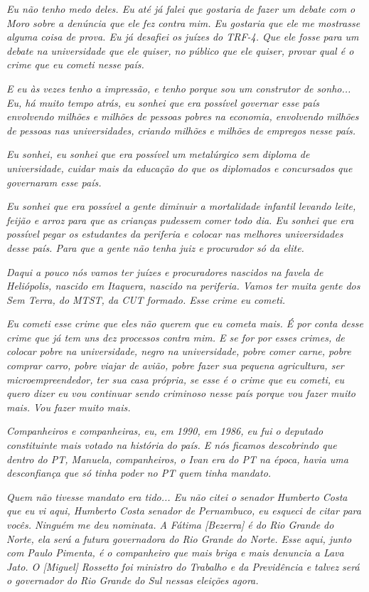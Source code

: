 \emph{Eu não tenho medo deles. Eu até já falei que gostaria de fazer um
debate com o Moro sobre a denúncia que ele fez contra mim. Eu gostaria
que ele me mostrasse alguma coisa de prova. Eu já desafiei os juízes do
TRF-4. Que ele fosse para um debate na universidade que ele quiser, no
público que ele quiser, provar qual é o crime que eu cometi nesse país.}

\emph{E eu às vezes tenho a impressão, e tenho porque sou um construtor
de sonho... Eu, há muito tempo atrás, eu sonhei que era possível
governar esse país envolvendo milhões e milhões de pessoas pobres na
economia, envolvendo milhões de pessoas nas universidades, criando
milhões e milhões de empregos nesse país.}

\emph{Eu sonhei, eu sonhei que era possível um metalúrgico sem diploma
de universidade, cuidar mais da educação do que os diplomados e
concursados que governaram esse país.}

\emph{Eu sonhei que era possível a gente diminuir a mortalidade infantil
levando leite, feijão e arroz para que as crianças pudessem comer todo
dia. Eu sonhei que era possível pegar os estudantes da periferia e
colocar nas melhores universidades desse país. Para que a gente não
tenha juiz e procurador só da elite.}

\emph{Daqui a pouco nós vamos ter juízes e procuradores nascidos na
favela de Heliópolis, nascido em Itaquera, nascido na periferia. Vamos
ter muita gente dos Sem Terra, do MTST, da CUT formado. Esse crime eu
cometi.}

\emph{Eu cometi esse crime que eles não querem que eu cometa mais. É por
conta desse crime que já tem uns dez processos contra mim. E se for por
esses crimes, de colocar pobre na universidade, negro na universidade,
pobre comer carne, pobre comprar carro, pobre viajar de avião, pobre
fazer sua pequena agricultura, ser microempreendedor, ter sua casa
própria, se esse é o crime que eu cometi, eu quero dizer eu vou
continuar sendo criminoso nesse país porque vou fazer muito mais. Vou
fazer muito mais.~}

\emph{Companheiros e companheiras, eu, em 1990, em 1986, eu fui o
deputado constituinte mais votado na história do país. E nós ficamos
descobrindo que dentro do PT, Manuela, companheiros, o Ivan era do PT na
época, havia uma desconfiança que só tinha poder no PT quem tinha
mandato.}

\emph{Quem não tivesse mandato era tido... Eu não citei o senador
Humberto Costa que eu vi aqui, Humberto Costa senador de Pernambuco, eu
esqueci de citar para vocês. Ninguém me deu nominata. A Fátima
{[}Bezerra{]} é do Rio Grande do Norte, ela será a futura governadora do
Rio Grande do Norte. Esse aqui, junto com Paulo Pimenta, é o companheiro
que mais briga e mais denuncia a Lava Jato. O {[}Miguel{]} Rossetto foi
ministro do Trabalho e da Previdência e talvez será o governador do Rio
Grande do Sul nessas eleições agora.}

